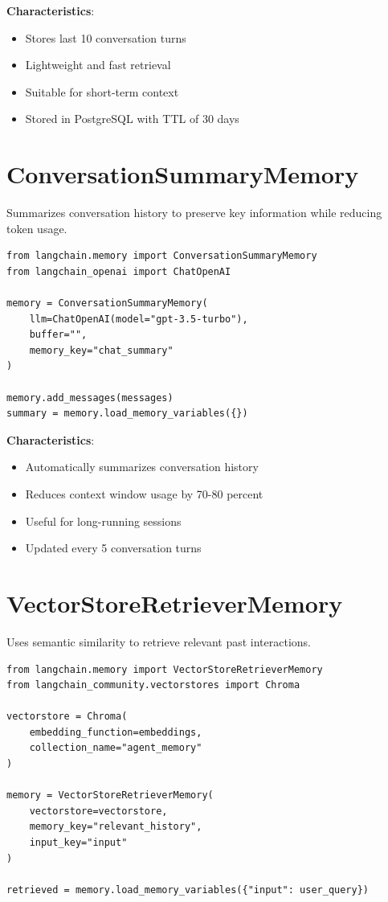 \documentclass{report}
\begin{document}
\textbf{Characteristics}:
\begin{itemize}
    \item Stores last 10 conversation turns
    \item Lightweight and fast retrieval
    \item Suitable for short-term context
    \item Stored in PostgreSQL with TTL of 30 days
\end{itemize}

\section{ConversationSummaryMemory}

Summarizes conversation history to preserve key information while reducing token usage.

\begin{lstlisting}
from langchain.memory import ConversationSummaryMemory
from langchain_openai import ChatOpenAI

memory = ConversationSummaryMemory(
    llm=ChatOpenAI(model="gpt-3.5-turbo"),
    buffer="",
    memory_key="chat_summary"
)

memory.add_messages(messages)
summary = memory.load_memory_variables({})
\end{lstlisting}

\textbf{Characteristics}:
\begin{itemize}
    \item Automatically summarizes conversation history
    \item Reduces context window usage by 70-80 percent
    \item Useful for long-running sessions
    \item Updated every 5 conversation turns
\end{itemize}

\section{VectorStoreRetrieverMemory}

Uses semantic similarity to retrieve relevant past interactions.

\begin{lstlisting}
from langchain.memory import VectorStoreRetrieverMemory
from langchain_community.vectorstores import Chroma

vectorstore = Chroma(
    embedding_function=embeddings,
    collection_name="agent_memory"
)

memory = VectorStoreRetrieverMemory(
    vectorstore=vectorstore,
    memory_key="relevant_history",
    input_key="input"
)

retrieved = memory.load_memory_variables({"input": user_query})
\end{lstlisting}
\end{document}
